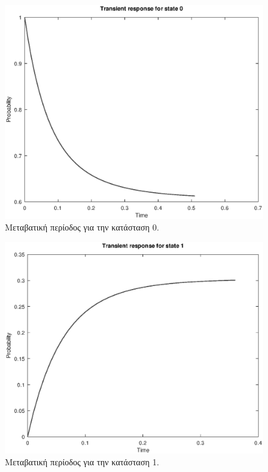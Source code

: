 \documentclass {article}
\begin{document}
\begin{figure}
	\includegraphics[width=\linewidth]{trans_0}
	\caption{Μεταβατική περίοδος για την κατάσταση 0.}
	\label{fig:trans_0}
\end{figure}

\begin{figure}
	\includegraphics[width=\linewidth]{trans_1}
	\caption{Μεταβατική περίοδος για την κατάσταση 1.}
	\label{fig:trans_1}
\end{figure}
\end{document}
